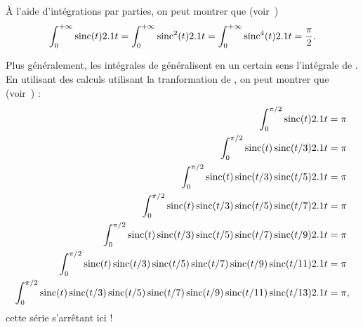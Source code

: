 À l'aide d'intégrations par parties, on peut montrer que (voir~\cite{ensai_1_mp_1996})
\[
\int_0^{+\infty} \sinc(t) \d t
= \int_0^{+\infty} \sinc^2(t) \d t
= \int_0^{+\infty} \sinc^4(t) \d t
= \frac{\pi}{2}.
\]

Plus généralement, les intégrales de  généralisent en un certain sens l'intégrale de . En utilisant des calculs utilisant la tranformation de , on peut montrer que (voir~\cite{rioul}) :
\begin{align*}
\int_0^{\pi/2} \sinc(t) \d t &= \pi\\
\int_0^{\pi/2} \sinc(t) \sinc(t/3) \d t &= \pi\\
\int_0^{\pi/2} \sinc(t) \sinc(t/3) \sinc(t/5) \d t &= \pi\\
\int_0^{\pi/2} \sinc(t) \sinc(t/3) \sinc(t/5) \sinc(t/7) \d t &= \pi\\
\int_0^{\pi/2} \sinc(t) \sinc(t/3) \sinc(t/5) \sinc(t/7) \sinc(t/9) \d t &= \pi\\
\int_0^{\pi/2} \sinc(t) \sinc(t/3) \sinc(t/5) \sinc(t/7) \sinc(t/9) \sinc(t/11) \d t &= \pi\\
\int_0^{\pi/2} \sinc(t) \sinc(t/3) \sinc(t/5) \sinc(t/7) \sinc(t/9) \sinc(t/11) \sinc(t/13) \d t &= \pi,
\end{align*}
cette série s'arrêtant ici ! 